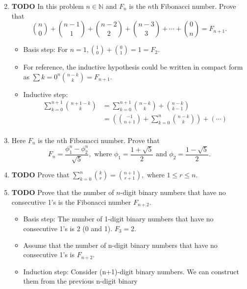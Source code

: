 \documentclass[11pt, oneside]{amsart}
\begin{document}
\begin{enumerate}
\begin{itemize}
\begin{equation*}
\end{equation*}
\end{itemize}
\item {\bfseries\sffamily TODO} In this problem \(n \in \mathbb{N}\) and \(F_n\) is the \(n\)th Fibonacci number.  Prove that
\label{sec:orgbd4d5f2}
\begin{equation*}
\binom{n}{0} + \binom{n-1}{1} + \binom{n-2}{2} + \binom{n-3}{3} + \dotsb + \binom{0}{n} = F_{n+1}.
\end{equation*}
\begin{itemize}
\item Basis step: For \(n = 1, \binom{1}{0} + \binom{0}{1} = 1 = F_2.\)
\item For reference, the inductive hypothesis could be written in compact form as \(\sum{k=0}^n \binom{n-k}{k} =
      F_{n+1}.\)
\item Inductive step:
\begin{align*}
\sum_{k=0}^{n+1} \binom{n+1-k}{k} &= \sum_{k=0}^{n+1} \binom{n-k}{k} + \binom{n-k}{k-1}  \\
&= \left( \binom{-1}{n+1} + \sum_{k=0}^n \binom{n-k}{k} \right) + \left( \dotsb \right) \\
\end{align*}
\end{itemize}
\item Here \(F_n\) is the \(n\)th Fibonacci number.  Prove that
\label{sec:orgd265aa0}
\begin{equation*}
F_n = \frac{\phi_1^n - \phi_2^n}{\sqrt{5}}, \text{ where } \phi_1 = \frac{1+\sqrt{5}}{2} \text{ and } \phi_2 =
\frac{1-\sqrt{5}}{2}.
\end{equation*}
\item {\bfseries\sffamily TODO} Prove that \(\sum_{k=0}^n \binom{k}{r} = \binom{n+1}{r+1},\) where \(1 \leq r \leq n.\)
\label{sec:org2fb5b90}
\item {\bfseries\sffamily TODO} Prove that the number of \(n\)-digit binary numbers that have no consecutive 1's is the Fibonacci number \(F_{n+2}.\)
\label{sec:org61435c9}
\begin{itemize}
\item Basis step: The number of 1-digit binary numbers that have no consecutive 1's is 2 (0 and 1). \(F_3=2.\)
\item Assume that the number of n-digit binary numbers that have no consecutive 1's is \(F_{n+2}\).
\item Induction step: Consider (n+1)-digit binary numbers.  We can construct them from the previous n-digit binary

\end{itemize}
\end{enumerate}
\end{document}

